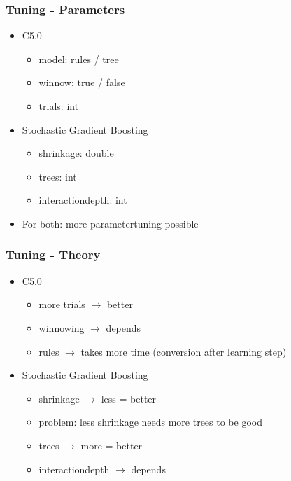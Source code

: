 \documentclass[color=usenames,dvipsnames]{beamer}
\begin{document}
\begin{frame}
\frametitle{Tuning - Parameters}
	\begin{itemize}
	\item C5.0
	\begin{itemize}
		\item model: rules / tree
		\item winnow: true / false
		\item trials: int
	\end{itemize}
	\item Stochastic Gradient Boosting
	\begin{itemize}
		\item shrinkage: double
		\item trees: int
		\item interactiondepth: int
	\end{itemize}
	\item For both: more parametertuning possible
	\end{itemize}
\end{frame}

\begin{frame}
\frametitle{Tuning - Theory}
	\begin{itemize}
	\item C5.0
	\begin{itemize}
		\item more trials $\rightarrow$ better
		\item winnowing $\rightarrow$ depends
		\item rules $\rightarrow$ takes more time (conversion after learning step)
	\end{itemize}
	\item Stochastic Gradient Boosting
	\begin{itemize}
		\item shrinkage $\rightarrow$ less = better
		\item problem: less shrinkage needs more trees to be good
		\item trees $\rightarrow$ more = better
		\item interactiondepth $\rightarrow$ depends
	\end{itemize}
	\end{itemize}
\end{frame}
\end{document}
